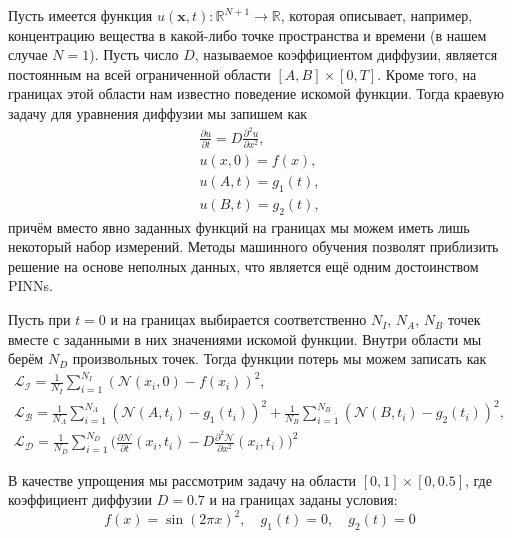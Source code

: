 \documentclass[a4paper, 12pt]{article}
\begin{document}
Пусть имеется функция $u(\mathbf{x}, t) : \mathbb{R}^{N + 1} \to \mathbb{R}$, которая описывает, например, концентрацию вещества в какой-либо точке пространства и времени (в нашем случае $N = 1$). Пусть число $D$, называемое коэффициентом диффузии, является постоянным на всей ограниченной области $[A, B] \times [0, T]$. Кроме того, на границах этой области нам известно поведение искомой функции. Тогда краевую задачу для уравнения диффузии мы запишем как
\begin{equation} \label{eq:diffusion:problemStatement}
\begin{gathered}
    \frac{\partial u}{\partial t} = D \frac{\partial^2 u}{\partial x^2}, \\
    u(x, 0) = f(x), \\
    u(A, t) = g_1(t), \\
    u(B, t) = g_2(t),
\end{gathered}
\end{equation}
причём вместо явно заданных функций на границах мы можем иметь лишь некоторый набор измерений. Методы машинного обучения позволят приблизить решение на основе неполных данных, что является ещё одним достоинством PINNs.

Пусть при $t = 0$ и на границах выбирается соответственно $N_I$, $N_A$, $N_B$ точек вместе с заданными в них значениями искомой функции. Внутри области мы берём $N_D$ произвольных точек. Тогда функции потерь мы можем записать как
\begin{equation} \label{eq:diffusion:loss}
\begin{gathered}
    \mathcal{L_I} = \frac{1}{N_I}\sum_{i=1}^{N_I} (\mathcal{N}(x_i, 0) - f(x_i))^2,\\
    \mathcal{L_B} = \frac{1}{N_A}\sum_{i=1}^{N_A} (\mathcal{N}(A, t_i) - g_1(t_i))^2 + \frac{1}{N_B}\sum_{i=1}^{N_B} (\mathcal{N}(B, t_i) - g_2(t_i))^2,\\
    \mathcal{L_D} = \frac{1}{N_D}\sum_{i=1}^{N_D} \Big(\frac{\partial \mathcal{N}}{\partial t}(x_i, t_i) - D \frac{\partial^2 \mathcal{N}}{\partial x^2}(x_i, t_i)\Big)^2
\end{gathered}
\end{equation}

В качестве упрощения мы рассмотрим задачу на области $[0, 1] \times [0, 0.5]$, где коэффициент диффузии $D = 0.7$ и на границах заданы условия:
$$
f(x) = \sin(2 \pi x)^2, \quad g_1(t) = 0, \quad g_2(t) = 0
$$
\end{document}
